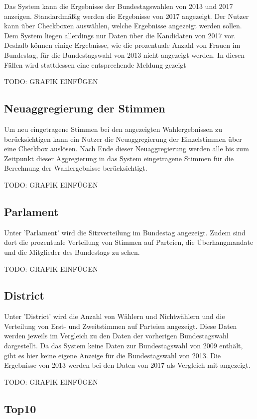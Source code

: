 \documentclass[a4paper]{scrreprt}
\begin{document}
Das System kann die Ergebnisse der Bundestagswahlen von 2013 und 2017 anzeigen. Standardmäßig werden die Ergebnisse von 2017 angezeigt. Der Nutzer kann über Checkboxen auswählen, welche Ergebnisse angezeigt werden sollen. Dem System liegen allerdings nur Daten über die Kandidaten von 2017 vor. Deshalb können einige Ergebnisse, wie die prozentuale Anzahl von Frauen im Bundestag, für die Bundestagswahl von 2013 nicht angezeigt werden. In diesen Fällen wird stattdessen eine entsprechende Meldung gezeigt

TODO: GRAFIK EINFÜGEN

\subsection{Neuaggregierung der Stimmen}

Um neu eingetragene Stimmen bei den angezeigten Wahlergebnissen zu berücksichtigen kann ein Nutzer die Neuaggregierung der Einzelstimmen über eine Checkbox auslösen. Nach Ende dieser Neuaggregierung werden alle bis zum Zeitpunkt dieser Aggregierung in das System eingetragene Stimmen für die Berechnung der Wahlergebnisse berücksichtigt.

TODO: GRAFIK EINFÜGEN

\subsection{Parlament}

Unter 'Parlament' wird die Sitzverteilung im Bundestag angezeigt. Zudem sind dort die prozentuale Verteilung von Stimmen auf Parteien,  die Überhangmandate und die Mitglieder des Bundestags zu sehen. 

TODO: GRAFIK EINFÜGEN

\subsection{District}

Unter 'District' wird die Anzahl von Wählern und Nichtwählern und die Verteilung von Erst- und Zweitstimmen auf Parteien angezeigt. Diese Daten werden jeweils im Vergleich zu den Daten der vorherigen Bundestagswahl dargestellt. Da das System keine Daten zur Bundestagswahl von 2009 enthält, gibt es hier keine eigene Anzeige für die Bundestagswahl von 2013. Die Ergebnisse von 2013 werden bei den Daten von 2017 als Vergleich mit angezeigt.

TODO: GRAFIK EINFÜGEN

\subsection{Top10}
\end{document}
